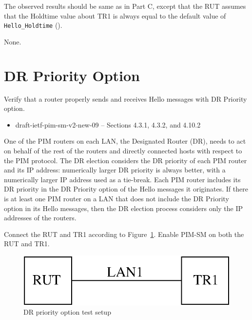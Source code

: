 \documentclass[11pt]{report}
\begin{document}

The observed results should be same as in Part C, except that
the RUT assumes that the Holdtime value about TR1 is always equal to the
default value of \verb=Hello_Holdtime= ({\PimsmHelloHoldtime}).

None.

\newpage
\section{DR Priority Option}

Verify that a router properly sends and receives Hello messages with DR
Priority option.

\begin{itemize}
  \item draft-ietf-pim-sm-v2-new-09 -- Sections 4.3.1, 4.3.2, and 4.10.2
\end{itemize}

One of the PIM routers on each LAN, the Designated Router (DR), needs to act
on behalf of the rest of the routers and directly connected hosts with respect
to the PIM protocol. The DR election considers the DR priority of each
PIM router and its IP address: numerically larger DR priority is always
better, with a numerically larger IP address used as a tie-break. Each PIM
router includes its DR priority in the DR Priority option of the Hello
messages it originates. If there is at least one PIM router on a LAN that does
not include the DR Priority option in its Hello messages, then the DR election
process considers only the IP addresses of the routers.

Connect the RUT and TR1 according to Figure~\ref{fig:pim_test_2_5_dr_priority_option}.
Enable PIM-SM on both the RUT and TR1.

\begin{figure}[htbp]
  \begin{center}
    \includegraphics[scale=0.8]{figs/pim_test_2_5_dr_priority_option}
    \caption{DR priority option test setup}
    \label{fig:pim_test_2_5_dr_priority_option}
  \end{center}
\end{figure}
\end{document}
